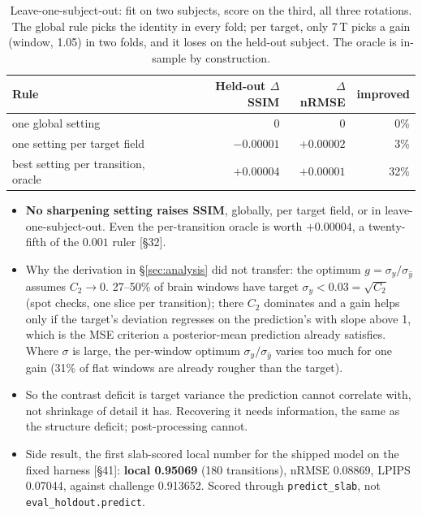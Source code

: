 \documentclass[10pt,a4paper]{article}
\begin{document}
\begin{table}[H]
\centering\small
\begin{tabular}{lrrr}
\toprule
Rule & Held-out $\Delta$SSIM & $\Delta$nRMSE & improved \\
\midrule
one global setting                 & $0$         & $0$          & 0\% \\
one setting per target field       & $-0.00001$  & $+0.00002$   & 3\% \\
best setting per transition, oracle & $+0.00004$ & $+0.00001$   & 32\% \\
\bottomrule
\end{tabular}
\caption{Leave-one-subject-out: fit on two subjects, score on the third, all three rotations.
The global rule picks the identity in every fold; per target, only 7\,T picks a gain (window,
1.05) in two folds, and it loses on the held-out subject. The oracle is in-sample by
construction.}
\label{tab:e1loso}
\end{table}

\begin{itemize}
  \item \textbf{No sharpening setting raises SSIM}, globally, per target field, or in
        leave-one-subject-out. Even the per-transition oracle is worth $+0.00004$, a
        twenty-fifth of the $0.001$ ruler [\S32].
  \item Why the derivation in \S\ref{sec:analysis} did not transfer: the optimum
        $g = \sigma_y/\sigma_{\hat y}$ assumes $C_2 \to 0$. 27--50\% of brain windows have
        target $\sigma_y < 0.03 = \sqrt{C_2}$ (spot checks, one slice per transition); there
        $C_2$ dominates and a gain helps only if the target's deviation regresses on the
        prediction's with slope above 1, which is the MSE criterion a posterior-mean prediction
        already satisfies. Where $\sigma$ is large, the per-window optimum $\sigma_y/\sigma_{\hat y}$
        varies too much for one gain (31\% of flat windows are already rougher than the target).
  \item So the contrast deficit is target variance the prediction cannot correlate with, not
        shrinkage of detail it has. Recovering it needs information, the same as the
        structure deficit; post-processing cannot.
  \item Side result, the first slab-scored local number for the shipped model on the fixed
        harness [\S41]: \textbf{local 0.95069} (180 transitions), nRMSE 0.08869, LPIPS 0.07044,
        against challenge 0.913652. Scored through \texttt{predict\_slab}, not
        \texttt{eval\_holdout.predict}.
\end{itemize}
\end{document}
